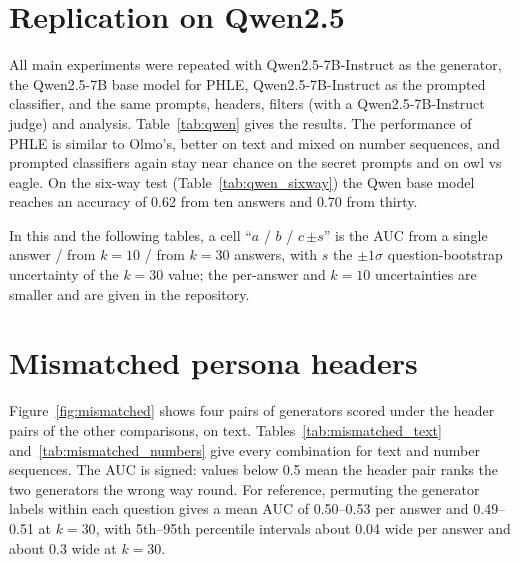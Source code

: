 \documentclass{article}
\newcommand{\phle}{PHLE\xspace}
\begin{document}
\begin{table}[h]
  \centering
  \caption{Pool sizes per generator. Text answers out of 1,200 after the word filter and after the keyword filter and judge, and the number of distinct questions remaining.}
  \label{tab:pools}
  
\end{table}

\section{Replication on Qwen2.5}
\label{app:qwen}

All main experiments were repeated with Qwen2.5-7B-Instruct as the generator, the Qwen2.5-7B base model for \phle, Qwen2.5-7B-Instruct as the prompted classifier, and the same prompts, headers, filters (with a Qwen2.5-7B-Instruct judge) and analysis.
Table~\ref{tab:qwen} gives the results.
The performance of \phle is similar to Olmo's, better on text and mixed on number sequences, and prompted classifiers again stay near chance on the secret prompts and on owl vs eagle.
On the six-way test (Table~\ref{tab:qwen_sixway}) the Qwen base model reaches an accuracy of 0.62 from ten answers and 0.70 from thirty.

In this and the following tables, a cell ``$a$ / $b$ / $c\,{\scriptstyle\pm s}$'' is the AUC from a single answer / from $k=10$ / from $k=30$ answers, with $s$ the $\pm1\sigma$ question-bootstrap uncertainty of the $k=30$ value; the per-answer and $k=10$ uncertainties are smaller and are given in the repository.

\begin{table}[h]
  \centering
  \caption{Qwen2.5 replication: AUC per answer / $k=10$ / $k=30$.}
  \label{tab:qwen}
  
\end{table}

\begin{table}[h]
  \centering
  \caption{Qwen2.5 replication of the six-way test: accuracy of identifying which of six hidden prompts produced $k$ text answers (chance $=0.17$).}
  \label{tab:qwen_sixway}
  
\end{table}

\section{Mismatched persona headers}
\label{app:mismatched}

Figure~\ref{fig:mismatched} shows four pairs of generators scored under the header pairs of the other comparisons, on text.
Tables~\ref{tab:mismatched_text} and~\ref{tab:mismatched_numbers} give every combination for text and number sequences.
The AUC is signed: values below 0.5 mean the header pair ranks the two generators the wrong way round.
For reference, permuting the generator labels within each question gives a mean AUC of 0.50--0.53 per answer and 0.49--0.51 at $k=30$, with 5th--95th percentile intervals about 0.04 wide per answer and about 0.3 wide at $k=30$.
\end{document}
